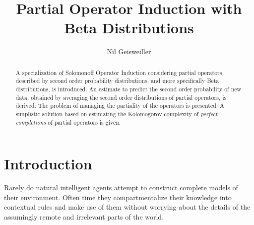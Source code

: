 \documentclass[runningheads]{llncs}
\begin{document}
%
\title{Partial Operator Induction with Beta Distributions}
%
%
\author{Nil Geisweiller}
%
%
%
\maketitle              %
%
\begin{abstract}
  A specialization of Solomonoff Operator Induction considering
  partial operators described by second order probability
  distributions, and more specifically Beta distributions, is
  introduced. An estimate to predict the second order probability of
  new data, obtained by averaging the second order distributions of
  partial operators, is derived. The problem of managing the
  partiality of the operators is presented. A simplistic solution
  based on estimating the Kolomogorov complexity of \emph{perfect
    completions} of partial operators is given.

\end{abstract}
%
%
%
\section{Introduction}
Rarely do natural intelligent agents attempt to construct complete
models of their environment. Often time they compartmentalize their
knowledge into contextual rules and make use of them without worrying
about the details of the assumingly remote and irrelevant parts of the
world.
\end{document}

